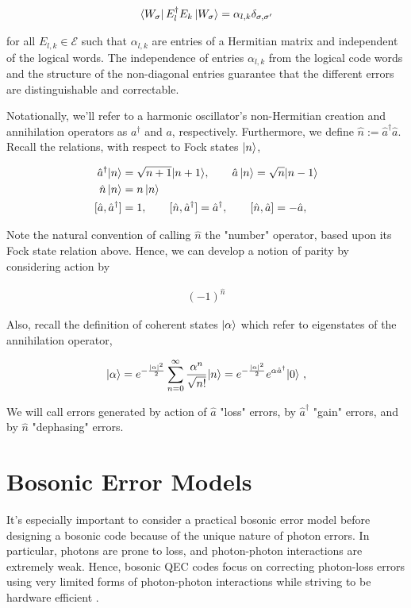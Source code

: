 \documentclass[12]{amsart}
\newcommand\0{\mathbf{0}}
\newcommand\<{\langle}
\renewcommand\>{\rangle}
\begin{document}
\begin{align}
\label{eq:k-l}
\bra{W_\sigma} E_l^\dag E_k \ket{W_\sigma} = \alpha_{l, k} \delta_{\sigma, \sigma'}	
\end{align}

for all $E_{l,k} \in \mathcal{E}$ such that $\alpha_{l,k}$ are entries of a Hermitian matrix and independent of the logical words. The independence of entries $\alpha_{l,k}$ from the logical code words and the structure of the non-diagonal entries guarantee that the different errors are distinguishable and correctable.

Notationally, we'll refer to a harmonic oscillator's non-Hermitian creation and annihilation operators as $a^\dag$ and $a$, respectively. Furthermore, we define $\hat{n} := \hat{a}^{\dag }\hat{a}$. Recall the relations, with respect to Fock states $\ket{n}$,

\begin{align*}
\hat{a}^{\dagger }|n\rangle &={\sqrt {n+1}}|n+1\rangle, \qquad \hat{a}\ket{n}={\sqrt {n}}|n-1\rangle \\
\hat{n}\ket{n} &= n\ket{n} \\
[\hat{a}, \hat{a}^{\dag }]&=1, \qquad[\hat{n},\hat{a}^{\dag }]=\hat{a}^{\dag }, \qquad[\hat{n}, \hat{a}]=-\hat{a},
\end{align*}

Note the natural convention of calling $\hat{n}$ the "number" operator, based upon its Fock state relation above. Hence, we can develop a notion of parity by considering action by

\begin{align}
\label{eq:parity}
(-1)^{\hat{n}}	
\end{align}


Also, recall the definition of coherent states $\ket{\alpha}$ which refer to eigenstates of the annihilation operator,

$$
|\alpha\rangle =e^{-{|\alpha|^2\over2}}\sum_{n=0}^{\infty}{\alpha^n\over\sqrt{n!}}|n\rangle =e^{-{|\alpha|^2\over2}}e^{\alpha\hat a^\dagger}|0\rangle ~,
$$

We will call errors generated by action of $\hat{a}$ "loss" errors, by $\hat{a}^\dag$ "gain" errors, and by $\hat{n}$ "dephasing" errors. 

\section{Bosonic Error Models}

It's especially important to consider a practical bosonic error model before designing a bosonic code because of the unique nature of photon errors. In particular, photons are prone to loss, and photon-photon interactions are extremely weak. Hence, bosonic QEC codes focus on correcting photon-loss errors using very limited forms of photon-photon interactions while striving to be hardware efficient \cite{niu2018hardware}. 
\end{document}
